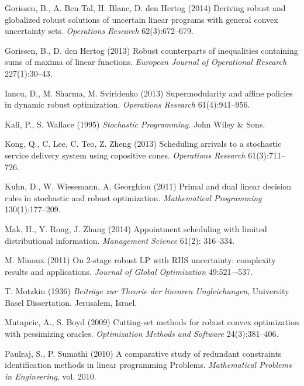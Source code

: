 \documentclass[fleqn,mnsc,blindrev]{informs4}
\begin{document}
\begin{thebibliography}{}
			Gorissen, B., A. Ben-Tal, H. Blanc, D. den Hertog (2014)
			Deriving robust and globalized robust solutions of uncertain linear programs with general convex uncertainty sets. {\it Operations Research} 62(3):672--679.
			
			Gorissen, B., D. den Hertog (2013)
			Robust counterparts of inequalities containing sums of maxima of linear functions. {\it European Journal of Operational Research} 227(1):30--43.
	
	         Iancu, D., M. Sharma, M. Sviridenko (2013)
         	Supermodularity and affine policies in dynamic robust optimization. {\it Operations Research} 61(4):941--956.		
			
			
			Kali, P., S. Wallace (1995)
			{\it Stochastic Programming}.  John Wiley \& Sons.
			
			Kong, Q., C. Lee, C. Teo, Z. Zheng (2013)
			Scheduling arrivals to a stochastic service delivery system using copositive cones. {\it Operations Research} 61(3):711--726.
			
			
			Kuhn, D., W. Wiesemann, A. Georghiou (2011)
			Primal and dual linear decision rules in stochastic and robust optimization. {\it Mathematical Programming} 130(1):177--209.
			
			
			Mak, H., Y. Rong, J.  Zhang (2014)
			Appointment scheduling with limited distributional information. {\it Management Science} 61(2): 316--334.
			
			M. Minoux (2011)
			On 2-stage robust LP with RHS uncertainty: complexity results and applications. {\it Journal of Global Optimization} 49:521–-537.

			
			T. Motzkin (1936)
			{\it Beitr\"age zur Theorie der linearen Ungleichungen}, University Basel Dissertation. Jerusalem, Israel.

			Mutapcic, A., S. Boyd (2009)
			Cutting-set methods for robust convex optimization with pessimizing oracles. {\it Optimization Methods and Software} 24(3):381--406.	

			
			Paulraj, S., P. Sumathi  (2010)
			A comparative study of redundant constraints identification methods in linear programming Problems. {\it Mathematical Problems in Engineering}, vol. 2010. 
			

\end{thebibliography}
\end{document}
